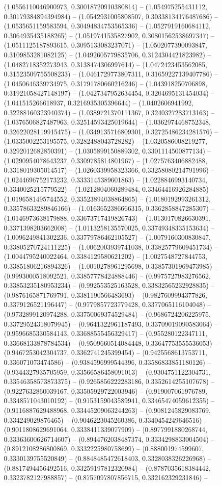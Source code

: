 (1.0556110046900973, 0.30018720910380814) -- (1.054975255431112, 0.30179384894394984) -- (1.0542931005808507, 0.30338134176487686) -- (1.0535651159583594, 0.30494834753565336) -- (1.0527919160684112, 0.3064935435188265) -- (1.0519741535827902, 0.30801562538697347) -- (1.0511125187893615, 0.3095133083237071) -- (1.0502077390093847, 0.3109853281082125) -- (1.0492605779835706, 0.3124304421823982) -- (1.0482718352273943, 0.3138474306997614) -- (1.0472423453562085, 0.31523509755508233) -- (1.0461729773807311, 0.31659227139407786) -- (1.0450646339734975, 0.31791780660216246) -- (1.043918250706898, 0.31921058427148197) -- (1.0427347952634454, 0.3204695131454034) -- (1.041515266618937, 0.3216935305396644) -- (1.0402606941992, 0.32288160323940374) -- (1.0389721370111367, 0.3240327283713163) -- (1.0376506827487963, 0.32514593425019644) -- (1.0362974468752348, 0.32622028119915475) -- (1.0349135716809301, 0.32725486234281576) -- (1.0335002253195575, 0.3282488043728282) -- (1.0320586008219277, 0.3292012682850391) -- (1.0305899150889302, 0.3301114500877134) -- (1.0290954078643237, 0.3309785814801967) -- (1.0275763406882488, 0.3318019305014517) -- (1.0260339958323366, 0.33258080214791996) -- (1.0244696752173232, 0.3333145389601863) -- (1.0228846993140734, 0.3340025215779522) -- (1.0212804060289484, 0.33464416926284885) -- (1.0196581495744552, 0.33523894038864865) -- (1.0180192993261312, 0.33578633289846166) -- (1.0163652386666315, 0.3362858847285307) -- (1.0146973638179888, 0.33673717419826743) -- (1.0130170826630391, 0.3371398203662008) -- (1.0113258135570025, 0.33749348335153634) -- (1.0096249841302236, 0.33779786462105527) -- (1.0079160300830847, 0.33805270724111225) -- (1.0062003939741038, 0.33825779609451734) -- (1.0044795240022464, 0.3384129580621202) -- (1.0027548727844753, 0.33851806216894326) -- (1.0010278961295698, 0.33857301969473985) -- (0.9993000518092521, 0.33857778424888446) -- (0.9975727983276562, 0.33853235180953234) -- (0.992553525163528, 0.33832565232928835) -- (0.9876165871769791, 0.3381190566483693) -- (0.9827609994377826, 0.3379126521196447) -- (0.9779857723779428, 0.3377065116104048) -- (0.9732899120974288, 0.33750069374529484) -- (0.9686724206225975, 0.33729524318079945) -- (0.9641322961187493, 0.33709019090583064) -- (0.9596685330584143, 0.33688555456329417) -- (0.955280122347111, 0.33668133878784534) -- (0.9509660514084448, 0.33647753555536053) -- (0.9467253042304737, 0.3362741245399454) -- (0.9425568613753711, 0.336071073474586) -- (0.9384596999544396, 0.33586833851180126) -- (0.9344327935705959, 0.33566586458091013) -- (0.9304751122304731, 0.33546358573873375) -- (0.9265856222283186, 0.3352614255107678) -- (0.9227632860039167, 0.33505929722003946) -- (0.919007061976789, 0.3348571043010192) -- (0.9153159043589941, 0.33465474059612355) -- (0.9116887629488968, 0.33445209063244263) -- (0.9081245829083769, 0.334249029876465) -- (0.9046223045260386, 0.3340454249646516) -- (0.9011808629691064, 0.3338411339077909) -- (0.8977991880268744, 0.33363600626714607) -- (0.8944762038487374, 0.3334298833004504) -- (0.8912108286800869, 0.3332225980758699) -- (0.888001974599607, 0.3330139755520849) -- (0.8848485472618403, 0.3328038326226968) -- (0.8817494456492516, 0.33259197812320984) -- (0.8787035618384442, 0.3323782127988857) -- (0.8757097807856715, 0.332162329231846) -- 